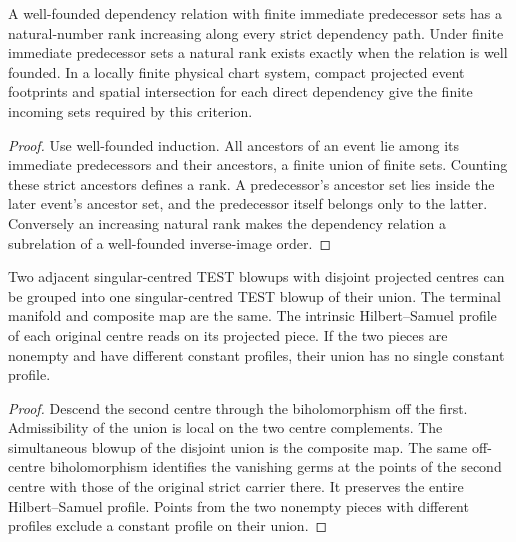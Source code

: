 \begin{theorem}
\label{hir:g8-finite-branching-rank}
\leanok
A well-founded dependency relation with finite immediate predecessor
sets has a natural-number rank increasing along every strict
dependency path. Under finite immediate predecessor sets a natural
rank exists exactly when the relation is well founded. In a locally
finite physical chart system, compact projected event footprints and
spatial intersection for each direct dependency give the finite
incoming sets required by this criterion.
\end{theorem}
\begin{proof}
Use well-founded induction. All ancestors of an event lie among its
immediate predecessors and their ancestors, a finite union of finite
sets. Counting these strict ancestors defines a rank. A predecessor's
ancestor set lies inside the later event's ancestor set, and the
predecessor itself belongs only to the latter. Conversely an increasing
natural rank makes the dependency relation a subrelation of a
well-founded inverse-image order.
\end{proof}

\begin{theorem}
\label{hir:g8-disjoint-grouping-labels}
\leanok
Two adjacent singular-centred TEST blowups with disjoint projected
centres can be grouped into one singular-centred TEST blowup of
their union. The terminal manifold and composite map are the same.
The intrinsic Hilbert--Samuel profile of each original centre reads
on its projected piece. If the two pieces are nonempty and have
different constant profiles, their union has no single constant profile.
\end{theorem}
\begin{proof}
Descend the second centre through the biholomorphism off the first.
Admissibility of the union is local on the two centre complements.
The simultaneous blowup of the disjoint union is the composite map.
The same off-centre biholomorphism identifies the vanishing germs
at the points of the second centre with those of the original
strict carrier there. It preserves the entire Hilbert--Samuel profile.
Points from the two nonempty pieces with different profiles exclude
a constant profile on their union.
\end{proof}

